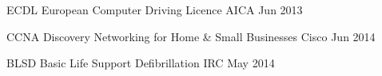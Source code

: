 

\begin{cvhonors}

	\cvhonor
	{ECDL}
	{European Computer Driving Licence}
	{AICA}
	{Jun 2013}
	
	\cvhonor
	{CCNA Discovery}
	{Networking for Home \& Small Businesses}
	{Cisco}
	{Jun 2014}
	
	\cvhonor
	{BLSD}
	{Basic Life Support Defibrillation}
	{IRC}
	{May 2014}

\end{cvhonors}
